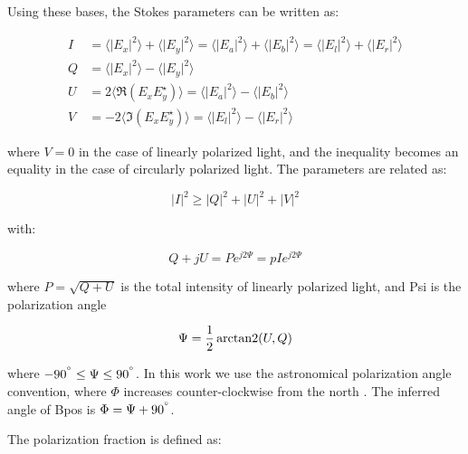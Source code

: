 Using these bases, the Stokes parameters can be written as:

\begin{equation}
  \begin{split}
  I &= \langle \lvert E_{x} \rvert ^{2} \rangle + \langle \lvert E_{y} \rvert ^{2} \rangle = \langle \lvert E_{a} \rvert ^{2} \rangle + \langle \lvert E_{b} \rvert ^{2} \rangle = \langle \lvert E_{l} \rvert ^{2} \rangle + \langle \lvert E_{r} \rvert ^{2} \rangle \\
  Q &= \langle \lvert E_{x} \rvert ^{2} \rangle - \langle \lvert E_{y} \rvert ^{2} \rangle \\
  U &= 2\langle \Re \left( E_{x}E_{y}^{\star} \right) \rangle = \langle \lvert E_{a} \rvert ^{2} \rangle - \langle \lvert E_{b} \rvert ^{2} \rangle \\
  V &= -2\langle \Im \left( E_{x}E_{y}^{\star} \right) \rangle = \langle \lvert E_{l} \rvert ^{2} \rangle - \langle \lvert E_{r} \rvert ^{2} \rangle
  \end{split}
\end{equation}

where $V = 0$ in the case of linearly polarized light, and the inequality becomes an equality in the case of circularly polarized light. The parameters are related as:

\begin{equation}
  \lvert I \rvert ^{2} \geq \lvert Q \rvert ^{2} + \lvert U \rvert ^{2} + \lvert V \rvert ^{2}
\end{equation}

with:

\begin{equation}
  Q + jU = Pe^{j2\Psi} = p I e^{j2\Psi}
\end{equation}

where $P = \sqrt{Q + U}$ is the total intensity of linearly polarized light, and \gls{Psi} is the polarization angle

\begin{equation}\label{eq:pol angle}
  \Psi = \frac{1}{2} \operatorname{arctan2}(U, Q)
\end{equation}

where $-90^{\degree} \leq \Psi \leq 90^{\degree}$. In this work we use the astronomical polarization angle convention, where $\Phi$ increases counter-clockwise from the north \citep{shariff2015polarimetry}. The inferred angle of \gls{Bpos} is $\Phi = \Psi + 90^{\degree}$.

The polarization fraction is defined as:

